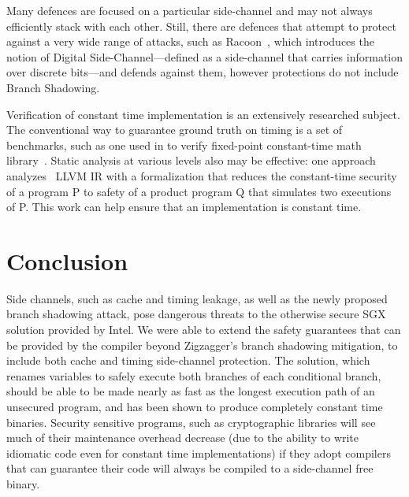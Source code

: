 \documentclass[sigplan, review]{acmart}
\begin{document}
Many defences are focused on a particular side-channel and may not always efficiently stack with each other. Still, there are defences that attempt to protect against a very wide range of attacks, such as Racoon~\cite{rane2015raccoon}, which introduces the notion of Digital Side-Channel---defined as a side-channel that carries information over discrete bits---and defends against them, however protections do not include Branch Shadowing.

Verification of constant time implementation is an extensively researched subject. The conventional way to guarantee ground truth on timing is a set of benchmarks, such as one used in to verify fixed-point constant-time math library~\cite{andrysco2015subnormal}. Static analysis at various levels also may be effective: one approach analyzes~\cite{almeida2016verifying} LLVM IR with a formalization that reduces the constant-time security of a program P to safety of a product program Q that simulates two executions of P. This work can help ensure that an implementation is constant time.

\section{Conclusion}
Side channels, such as cache and timing leakage, as well as the newly proposed branch shadowing attack, pose dangerous threats to the otherwise secure SGX solution provided by Intel. We were able to extend the safety guarantees that can be provided by the compiler beyond Zigzagger's branch shadowing mitigation, to include both cache and timing side-channel protection. The solution, which renames variables to safely execute both branches of each conditional branch, should be able to be made nearly as fast as the longest execution path of an unsecured program, and has been shown to produce completely constant time binaries. Security sensitive programs, such as cryptographic libraries will see much of their maintenance overhead decrease (due to the ability to write idiomatic code even for constant time implementations) if they adopt compilers that can guarantee their code will always be compiled to a side-channel free binary.


{
}
\end{document}
